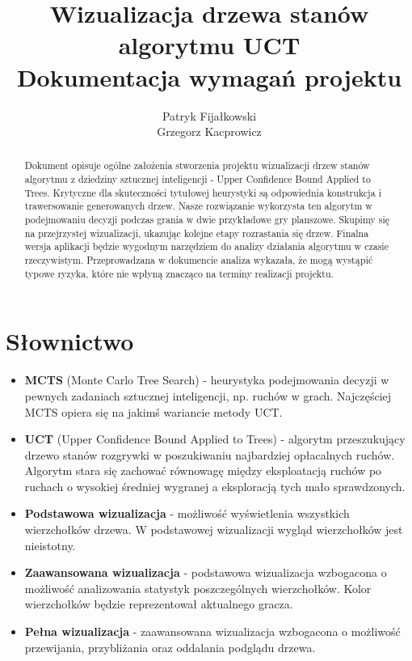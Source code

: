 \documentclass{article}
\title{
	Wizualizacja drzewa stanów algorytmu UCT \\
	\large Dokumentacja wymagań projektu}
\author{Patryk Fijałkowski \\ Grzegorz Kacprowicz}
\let\oldsection\section
\renewcommand\section{\clearpage\oldsection}
\begin{document}
	\begin{titlingpage}
		\maketitle
		\vspace{3cm}
		\begin{abstract}
			Dokument opisuje ogólne założenia stworzenia projektu wizualizacji drzew stanów algorytmu z dziedziny sztucznej inteligencji - Upper Confidence Bound Applied to Trees. Krytyczne dla skuteczności tytułowej heurystyki są odpowiednia konstrukcja i trawersowanie generowanych drzew. Nasze rozwiązanie wykorzysta ten algorytm w podejmowaniu decyzji podczas grania w dwie przykładowe gry planszowe. Skupimy się na przejrzystej wizualizacji, ukazując kolejne etapy rozrastania się drzew. Finalna wersja aplikacji będzie wygodnym narzędziem do analizy działania algorytmu w czasie rzeczywistym. Przeprowadzana w dokumencie analiza wykazała, że mogą wystąpić typowe ryzyka, które nie wpłyną znacząco na terminy realizacji projektu.
		\end{abstract}
	\end{titlingpage}

	\begin{versionhistory}
	\end{versionhistory}
	
	\tableofcontents
	
		
	\section{Słownictwo}
	\begin{itemize}
		\item \textbf{MCTS} (Monte Carlo Tree Search) - heurystyka podejmowania decyzji w pewnych zadaniach sztucznej inteligencji, np. ruchów w grach. Najczęściej MCTS opiera się na jakimś wariancie metody UCT.
		\item \textbf{UCT} (Upper Confidence Bound Applied to Trees) - algorytm przeszukujący drzewo stanów rozgrywki w poszukiwaniu najbardziej opłacalnych ruchów. Algorytm stara się zachować równowagę między eksploatacją ruchów po ruchach o wysokiej średniej wygranej a eksploracją tych mało sprawdzonych.
		\item \textbf{Podstawowa wizualizacja} - możliwość wyświetlenia wszystkich wierzchołków drzewa. W podstawowej wizualizacji wygląd wierzchołków jest nieistotny.
		\item \textbf{Zaawansowana wizualizacja} - podstawowa wizualizacja wzbogacona o możliwość analizowania statystyk poszczególnych wierzchołków. Kolor wierzchołków będzie reprezentował aktualnego gracza.
		\item \textbf{Pełna wizualizacja} - zaawansowana wizualizacja wzbogacona o możliwość przewijania, przybliżania oraz oddalania podglądu drzewa.
	\end{itemize}
\end{document}
